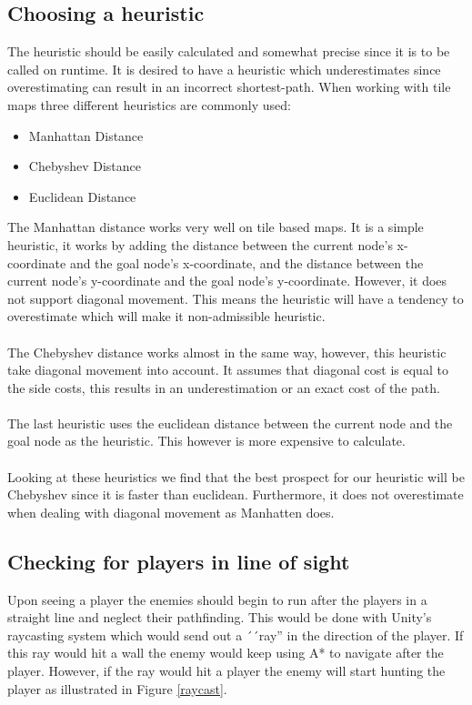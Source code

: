 \subsection*{Choosing a heuristic}
The heuristic should be easily calculated and somewhat precise since it is to be called on runtime.
It is desired to have a heuristic which underestimates since overestimating can result in an incorrect shortest-path.
When working with tile maps three different heuristics are commonly used\cite{heuristics}:
\begin{itemize}
\item Manhattan Distance
\item Chebyshev Distance
\item Euclidean Distance
\end{itemize}
The Manhattan distance works very well on tile based maps. 
It is a simple heuristic, it works by adding the distance between the current node's x-coordinate and the goal node's x-coordinate, and the distance between the current node's y-coordinate and the goal node's y-coordinate.
However, it does not support diagonal movement. 
This means the heuristic will have a tendency to overestimate which will make it non-admissible heuristic.\\\\
The Chebyshev distance works almost in the same way, however, this heuristic take diagonal movement into account. 
It assumes that diagonal cost is equal to the side costs, this results in an underestimation or an exact cost of the path.\\\\
The last heuristic uses the euclidean distance between the current node and the goal node as the heuristic.
This however is more expensive to calculate.\\\\
Looking at these heuristics we find that the best prospect for our heuristic will be Chebyshev since it is faster than euclidean. 
Furthermore, it does not overestimate when dealing with diagonal movement as Manhatten does.

\subsection*{Checking for players in line of sight}
Upon seeing a player the enemies should begin to run after the players in a straight line and neglect their pathfinding. 
This would be done with Unity's raycasting system\cite{raycast} which would send out a ´´ray'' in the direction of the player. 
If this ray would hit a wall the enemy would keep using A* to navigate after the player.
However, if the ray would hit a player the enemy will start hunting the player as illustrated in Figure \ref{raycast}.

